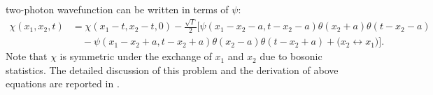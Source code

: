 \documentclass[final,1p,times]{elsarticle}
\begin{document}
two-photon wavefunction 
can be written in terms of $\psi$:  
\begin{equation}
\begin{aligned}
\chi(x_1, x_2, t)& = \chi(x_1-t, x_2-t, 0)-\frac{\sqrt{\Gamma}}{2}\biggl[
\psi(x_1-x_2-a, t-x_2-a)\theta(x_2+a)\theta(t-x_2-a)\\
&\quad
-\psi(x_1-x_2+a, t-x_2+a)\theta(x_2-a)\theta(t-x_2+a) +\bigl(x_2 \leftrightarrow x_1\bigr)
\biggr].
\label{eq:formal solution of two-photon wavefunction}
\end{aligned}
\end{equation}
Note that $\chi$ is symmetric under the exchange of $x_1$ and $x_2$ due to bosonic statistics. The detailed discussion of this problem and the derivation of above equations are reported in \cite{FangNJP18}.
\end{document}
